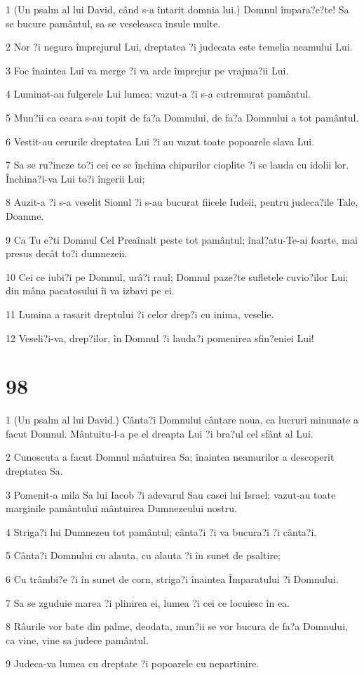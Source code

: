 \par 1 (Un psalm al lui David, când s-a întarit domnia lui.) Domnul împara?e?te! Sa se bucure pamântul, sa se veseleasca insule multe.
\par 2 Nor ?i negura împrejurul Lui, dreptatea ?i judecata este temelia neamului Lui.
\par 3 Foc înaintea Lui va merge ?i va arde împrejur pe vrajma?ii Lui.
\par 4 Luminat-au fulgerele Lui lumea; vazut-a ?i s-a cutremurat pamântul.
\par 5 Mun?ii ca ceara s-au topit de fa?a Domnului, de fa?a Domnului a tot pamântul.
\par 6 Vestit-au cerurile dreptatea Lui ?i au vazut toate popoarele slava Lui.
\par 7 Sa se ru?ineze to?i cei ce se închina chipurilor cioplite ?i se lauda cu idolii lor. Închina?i-va Lui to?i îngerii Lui;
\par 8 Auzit-a ?i s-a veselit Sionul ?i s-au bucurat fiicele Iudeii, pentru judeca?ile Tale, Doamne.
\par 9 Ca Tu e?ti Domnul Cel Preaînalt peste tot pamântul; înal?atu-Te-ai foarte, mai presus decât to?i dumnezeii.
\par 10 Cei ce iubi?i pe Domnul, urâ?i raul; Domnul paze?te sufletele cuvio?ilor Lui; din mâna pacatosului îi va izbavi pe ei.
\par 11 Lumina a rasarit dreptului ?i celor drep?i cu inima, veselie.
\par 12 Veseli?i-va, drep?ilor, în Domnul ?i lauda?i pomenirea sfin?eniei Lui!

\chapter{98}

\par 1 (Un psalm al lui David.) Cânta?i Domnului cântare noua, ca lucruri minunate a facut Domnul. Mântuitu-l-a pe el dreapta Lui ?i bra?ul cel sfânt al Lui.
\par 2 Cunoscuta a facut Domnul mântuirea Sa; înaintea neamurilor a descoperit dreptatea Sa.
\par 3 Pomenit-a mila Sa lui Iacob ?i adevarul Sau casei lui Israel; vazut-au toate marginile pamântului mântuirea Dumnezeului nostru.
\par 4 Striga?i lui Dumnezeu tot pamântul; cânta?i ?i va bucura?i ?i cânta?i.
\par 5 Cânta?i Domnului cu alauta, cu alauta ?i în sunet de psaltire;
\par 6 Cu trâmbi?e ?i în sunet de corn, striga?i înaintea Împaratului ?i Domnului.
\par 7 Sa se zguduie marea ?i plinirea ei, lumea ?i cei ce locuiesc în ea.
\par 8 Râurile vor bate din palme, deodata, mun?ii se vor bucura de fa?a Domnului, ca vine, vine sa judece pamântul.
\par 9 Judeca-va lumea cu dreptate ?i popoarele cu nepartinire.

